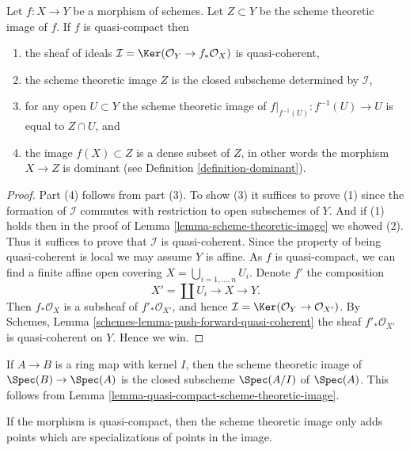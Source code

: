 \begin{lemma}
\label{lemma-quasi-compact-scheme-theoretic-image}
Let $f : X \to Y$ be a morphism of schemes.
Let $Z \subset Y$ be the scheme theoretic image of $f$.
If $f$ is quasi-compact then
\begin{enumerate}
\item the sheaf of ideals
$\mathcal{I} = \Ker(\mathcal{O}_Y \to f_*\mathcal{O}_X)$
is quasi-coherent,
\item the scheme theoretic image $Z$ is the closed subscheme
determined by $\mathcal{I}$,
\item for any open $U \subset Y$ the scheme theoretic image of
$f|_{f^{-1}(U)} : f^{-1}(U) \to U$ is equal to $Z \cap U$, and
\item the image $f(X) \subset Z$ is a dense subset of $Z$, in other
words the morphism $X \to Z$ is dominant
(see Definition \ref{definition-dominant}).
\end{enumerate}
\end{lemma}

\begin{proof}
Part (4) follows from part (3). To show (3) it suffices
to prove (1) since the formation of $\mathcal{I}$ commutes with restriction to
open subschemes of $Y$. And if (1) holds then in the proof of
Lemma \ref{lemma-scheme-theoretic-image}
we showed (2). Thus it suffices to prove that $\mathcal{I}$ is quasi-coherent.
Since the property of being quasi-coherent is
local we may assume $Y$ is affine. As $f$ is quasi-compact,
we can find a finite affine open covering
$X = \bigcup_{i = 1, \ldots, n} U_i$. Denote $f'$ the composition
$$
X' = \coprod U_i \longrightarrow X \longrightarrow Y.
$$
Then $f_*\mathcal{O}_X$ is a subsheaf of $f'_*\mathcal{O}_{X'}$,
and hence $\mathcal{I} = \Ker(\mathcal{O}_Y \to \mathcal{O}_{X'})$.
By Schemes, Lemma \ref{schemes-lemma-push-forward-quasi-coherent}
the sheaf $f'_*\mathcal{O}_{X'}$ is quasi-coherent on $Y$. Hence we win.
\end{proof}

\begin{example}
\label{example-scheme-theoretic-image}
If $A \to B$ is a ring map with kernel $I$, then the scheme theoretic image
of $\Spec(B) \to \Spec(A)$ is the closed subscheme
$\Spec(A/I)$ of $\Spec(A)$. This follows from
Lemma \ref{lemma-quasi-compact-scheme-theoretic-image}.
\end{example}

\noindent
If the morphism is quasi-compact, then the scheme theoretic image only
adds points which are specializations of points in the image.


